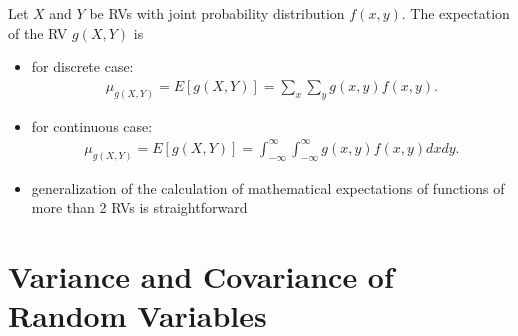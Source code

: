 \documentclass[10pt]{article}
\begin{document}
\begin{definition}
    Let $X$ and $Y$ be RVs with joint probability distribution $f(x,y)$. The expectation of the RV $g(X,Y)$ is 
    \begin{itemize}
        \item for discrete case:
            \begin{align*}
                \mu_{g(X,Y)} = E[g(X,Y)] = \sum_{x} \sum_{y} g(x,y)f(x,y)
            .\end{align*}
        \item for continuous case:
            \begin{align*}
                \mu_{g(X,Y)} = E[g(X,Y)] = \int_{-\infty}^{\infty} \int_{-\infty}^{\infty} g(x,y) f(x,y) dx dy  
            .\end{align*}
    \end{itemize}
\end{definition}
\begin{itemize}
    \item generalization of the calculation of mathematical expectations of functions of more than 2 RVs is straightforward
\end{itemize}


\section{Variance and Covariance of Random Variables}
\end{document}
